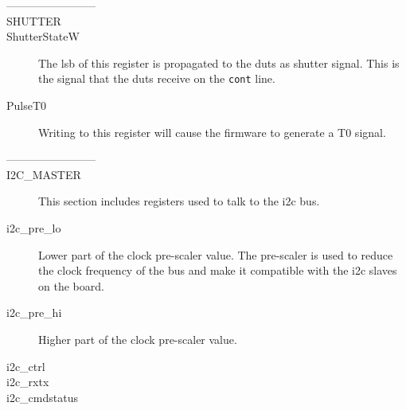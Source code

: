 \begin{description}
  \item[------------------------]
  \item[SHUTTER]
  \item[ShutterStateW] The \gls{lsb} of this register is propagated to the \gls{dut}s as shutter signal. This is the signal that the \gls{dut}s receive on the \verb|cont| line.
  \item[PulseT0] Writing to this register will cause the firmware to generate a T0 signal.
\end{description}

\begin{description}
  \item[------------------------]
  \item[I2C\_MASTER] This section includes registers used to talk to the \gls{i2c} bus.
  \item[i2c\_pre\_lo] Lower part of the clock pre-scaler value. The pre-scaler is used to reduce the clock frequency of the bus and make it compatible with the \gls{i2c} slaves on the board.
  \item[i2c\_pre\_hi] Higher part of the clock pre-scaler value.
  \item[i2c\_ctrl]
  \item[i2c\_rxtx]
  \item[i2c\_cmdstatus]
\end{description}

